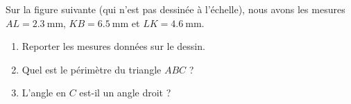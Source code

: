 
\begin{exercice}\cite{NEAPooZJNjMy}\label{exo2smath-0315}

    \begin{multicols}{2}

    Sur la figure suivante (qui n'est pas dessinée à l'échelle), nous avons les mesures \( AL=\SI{2.3}{\milli\meter}\), \( KB=\SI{6.5}{\milli\meter}\) et \( LK= \SI{4.6}{\milli\meter}\).


\begin{enumerate}
    \item
        Reporter les mesures données sur le dessin.
    \item
        Quel est le périmètre du triangle \( ABC\) ?
    \item
        L'angle en \( C\) est-il un angle droit ?
\end{enumerate}

\columnbreak

\begin{center}
                                                                            
\end{center}

    \end{multicols}

\end{exercice}
